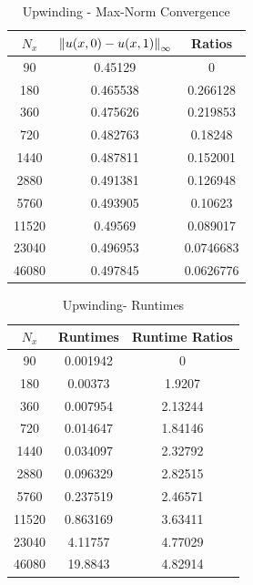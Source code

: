\documentclass[12pt]{article}
\begin{document}
\begin{minipage}{0.5\textwidth}
\begin{table}[H]
\caption{Upwinding - Max-Norm Convergence}
\centering\begin{tabular}{||c|cc||}
\hline \hline
    $N_x$ & $\norm{u(x,0)-u(x,1)}_{\infty}$ &    Ratios \\
\hline
    90 &         0.45129  & 0         \\
   180 &         0.465538 & 0.266128  \\
   360 &         0.475626 & 0.219853  \\
   720 &         0.482763 & 0.18248   \\
  1440 &         0.487811 & 0.152001  \\
  2880 &         0.491381 & 0.126948  \\
  5760 &         0.493905 & 0.10623   \\
 11520 &         0.49569  & 0.089017  \\
 23040 &         0.496953 & 0.0746683 \\
 46080 &         0.497845 & 0.0626776 \\
\hline \hline
\end{tabular}
\end{table}
\end{minipage}%
\begin{minipage}{0.5\textwidth}
\begin{table}[H]
\caption{Upwinding- Runtimes}
\centering\begin{tabular}{||c|cc||}
\hline \hline
    $N_x$ &   Runtimes &   Runtime Ratios \\
\hline
    90 &   0.001942 &          0       \\
   180 &   0.00373  &          1.9207  \\
   360 &   0.007954 &          2.13244 \\
   720 &   0.014647 &          1.84146 \\
  1440 &   0.034097 &          2.32792 \\
  2880 &   0.096329 &          2.82515 \\
  5760 &   0.237519 &          2.46571 \\
 11520 &   0.863169 &          3.63411 \\
 23040 &   4.11757  &          4.77029 \\
 46080 &  19.8843   &          4.82914 \\
\hline \hline
\end{tabular}\end{table}\end{minipage}\\
\end{document}
